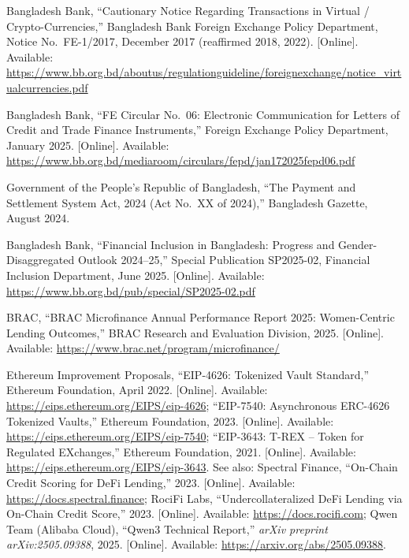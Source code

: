 \documentclass[12pt,a4paper]{report}
\begin{document}
{\begin{enumerate}[label={[\arabic*]}]
\item Bangladesh Bank, ``Cautionary Notice Regarding Transactions in Virtual / Crypto-Currencies,'' Bangladesh Bank Foreign Exchange Policy Department, Notice No.~FE-1/2017, December 2017 (reaffirmed 2018, 2022). [Online]. Available: \url{https://www.bb.org.bd/aboutus/regulationguideline/foreignexchange/notice_virtualcurrencies.pdf}

\item Bangladesh Bank, ``FE Circular No.~06: Electronic Communication for Letters of Credit and Trade Finance Instruments,'' Foreign Exchange Policy Department, January 2025. [Online]. Available: \url{https://www.bb.org.bd/mediaroom/circulars/fepd/jan172025fepd06.pdf}

\item Government of the People's Republic of Bangladesh, ``The Payment and Settlement System Act, 2024 (Act No.~XX of 2024),'' Bangladesh Gazette, August 2024.

\item Bangladesh Bank, ``Financial Inclusion in Bangladesh: Progress and Gender-Disaggregated Outlook 2024--25,'' Special Publication SP2025-02, Financial Inclusion Department, June 2025. [Online]. Available: \url{https://www.bb.org.bd/pub/special/SP2025-02.pdf}

\item BRAC, ``BRAC Microfinance Annual Performance Report 2025: Women-Centric Lending Outcomes,'' BRAC Research and Evaluation Division, 2025. [Online]. Available: \url{https://www.brac.net/program/microfinance/}

\item Ethereum Improvement Proposals, ``EIP-4626: Tokenized Vault Standard,'' Ethereum Foundation, April 2022. [Online]. Available: \url{https://eips.ethereum.org/EIPS/eip-4626}; ``EIP-7540: Asynchronous ERC-4626 Tokenized Vaults,'' Ethereum Foundation, 2023. [Online]. Available: \url{https://eips.ethereum.org/EIPS/eip-7540}; ``EIP-3643: T-REX -- Token for Regulated EXchanges,'' Ethereum Foundation, 2021. [Online]. Available: \url{https://eips.ethereum.org/EIPS/eip-3643}. See also: Spectral Finance, ``On-Chain Credit Scoring for DeFi Lending,'' 2023. [Online]. Available: \url{https://docs.spectral.finance}; RociFi Labs, ``Undercollateralized DeFi Lending via On-Chain Credit Score,'' 2023. [Online]. Available: \url{https://docs.rocifi.com}; Qwen Team (Alibaba Cloud), ``Qwen3 Technical Report,'' \textit{arXiv preprint arXiv:2505.09388}, 2025. [Online]. Available: \url{https://arxiv.org/abs/2505.09388}.


\end{enumerate}}
\end{document}
